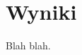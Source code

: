 \documentclass[polish,12pt]{aghthesis}
\begin{document}
\newpage




\section{Wyniki}
Blah blah.

\newpage



\nocite{bib-transit-oriented}


\newpage

\listoffigures
\newpage
\end{document}
